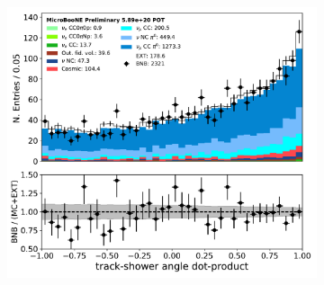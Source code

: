 \begin{figure}[H]
\begin{center}
\begin{subfigure}[b]{0.3\textwidth}
    \caption{}
    \end{subfigure}
    \begin{subfigure}[b]{0.3\textwidth}
    \centering
    \includegraphics[width=1.00\textwidth]{pi0/nueselection/tksh_angle_03112020_ALL_scaled.pdf}
    \caption{}
    \end{subfigure}
\caption{}
\label{fig:pi0:nueselection:trkvar}
\end{center}
\end{figure}

